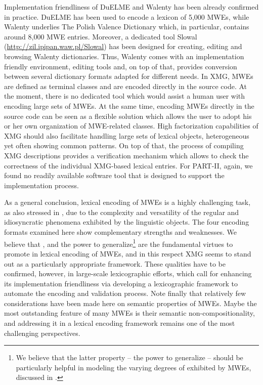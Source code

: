\documentclass[output=paper
,modfonts
,nonflat
,biblatexbackend=biber
]{langsci/langscibook}
\begin{document}
Implementation friendliness of DuELME and Walenty has been already confirmed in practice. DuELME has been used to encode a lexicon of 5,000  MWEs, while Walenty underlies The Polish Valence Dictionary which, in particular, contains around 8,000 MWE entries. Moreover, a dedicated tool Slowal (\url{http://zil.ipipan.waw.pl/Slowal}) has been designed for creating, editing and browsing Walenty dictionaries. Thus, Walenty comes with an implementation friendly environment, editing tools and, on top of that, provides conversion between several dictionary formats adapted for different needs. In XMG, MWEs are defined as terminal classes and are encoded directly in the source code. At the moment, there is no dedicated tool which would assist a human user with encoding large sets of MWEs. At the same time, encoding MWEs directly in the source code can be seen as a flexible solution which allows the user to adopt his or her own organization of MWE-related classes. High factorization capabilities of XMG should also facilitate handling large sets of lexical objects, heterogeneous yet often showing common patterns. On top of that, the process of compiling XMG descriptions provides a verification mechanism which allows to check the correctness of the individual XMG-based lexical entries. For PART-II, again, we found no readily available software tool that is designed to support the implementation process. 

As a general conclusion, lexical encoding of MWEs is a highly challenging task, as also stressed in , due to the complexity and versatility of the regular and idiosyncratic phenomena exhibited by the linguistic objects. The four encoding formats examined here show complementary strengths and weaknesses. We believe that ,  and the power to generalize\footnote{We believe that the latter property -- the power to generalize -- should be particularly helpful in modeling the varying degrees of  exhibited by MWEs, discussed in .} are the fundamental virtues to promote in lexical encoding of MWEs, and in this respect XMG seems to stand out as a particularly appropriate framework. These qualities have to be confirmed, however, in large-scale lexicographic efforts, which call for enhancing its implementation friendliness via developing a lexicographic framework to automate the encoding and validation process. Note finally that relatively few considerations have been made here on semantic properties of MWEs. Maybe the most outstanding feature of many MWEs is their semantic non-compositionality, and addressing it in a lexical encoding framework remains one of the most challenging perspectives.
 
\end{document}
